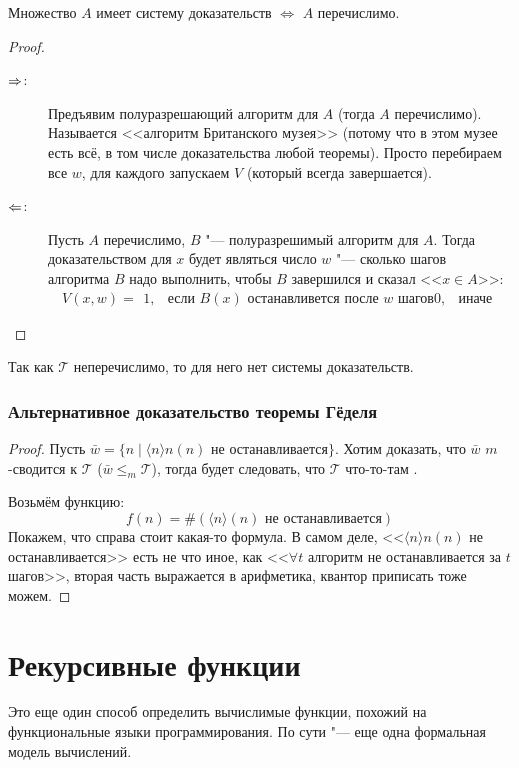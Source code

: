\begin{theorem}
	Множество $A$ имеет систему доказательств $\iff$ $A$ перечислимо.
\end{theorem}
\begin{proof}
	\begin{description}
	\item[$\Rightarrow$:]
		Предъявим полуразрешающий алгоритм для $A$ (тогда $A$ перечислимо).
		Называется <<алгоритм Британского музея>> (потому что в этом музее есть всё, в том числе доказательства любой теоремы).
		Просто перебираем все $w$, для каждого запускаем $V$ (который всегда завершается).
	\item[$\Leftarrow$:]
		Пусть $A$ перечислимо, $B$ "--- полуразрешимый алгоритм для $A$.
		Тогда доказательством для $x$ будет являться число $w$ "--- сколько шагов алгоритма $B$ надо выполнить,
		чтобы $B$ завершился и сказал <<$x \in A$>>:
		\[
		V(x, w) =
		\begin{matrix}
		1,& \text{если $B(x)$ останавливется после $w$ шагов}
		0,& \text{иначе}
		\end{matrix}
		\]
	\end{description}
\end{proof}
\begin{conseq}
	Так как $\mathcal{T}$ неперечислимо, то для него нет системы доказательств.
\end{conseq}

\subsubsection{Альтернативное доказательство теоремы Гёделя}
\begin{proof}
	Пусть $\bar w = \{ n \mid \langle n \rangle n(n) \text{~не останавливается} \}$.
	Хотим доказать, что $\bar w$ $m$-сводится к $\mathcal{T}$ ($\bar w \le_m \mathcal{T}$),
	тогда будет следовать, что $\mathcal{T}$ что-то-там \TODO.

	Возьмём функцию:
	\[ f(n) = \# (\langle n \rangle (n) \text{~не останавливается}) \]
	Покажем, что справа стоит какая-то формула.
	В самом деле, <<$\langle n \rangle n(n)$ не останавливается>> есть не что иное, как
	<<$\forall t$ алгоритм не останавливается за $t$ шагов>>, вторая часть выражается в арифметика,
	квантор приписать тоже можем.
\end{proof}

\section{Рекурсивные функции}
Это еще один способ определить вычислимые функции, похожий на функциональные языки программирования.
По сути "--- еще одна формальная модель вычислений.


